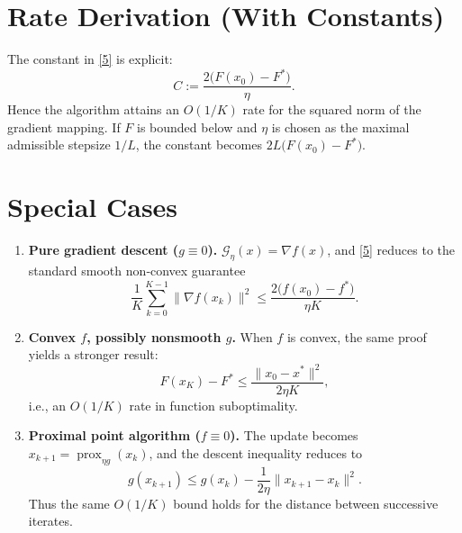 \documentclass{article}
\newcommand{\prox}{\operatorname{prox}}
\newcommand{\grad}{\nabla}
\begin{document}
\section*{Rate Derivation (With Constants)}
The constant in \eqref{5} is explicit:
\[
C:=\frac{2\big(F(x_{0})-F^{*}\big)}{\eta}.
\]
Hence the algorithm attains an $O(1/K)$ rate for the squared norm of the gradient mapping. If $F$ is bounded below and $\eta$ is chosen as the maximal admissible stepsize $1/L$, the constant becomes $2L\big(F(x_{0})-F^{*}\big)$.

\section*{Special Cases}
\begin{enumerate}
\item \textbf{Pure gradient descent ($g\equiv0$).}  
$\mathcal{G}_{\eta}(x)=\grad f(x)$, and \eqref{5} reduces to the standard smooth non‑convex guarantee
\[
\frac{1}{K}\sum_{k=0}^{K-1}\|\grad f(x_{k})\|^{2}\le\frac{2\big(f(x_{0})-f^{*}\big)}{\eta K}.
\]

\item \textbf{Convex $f$, possibly nonsmooth $g$.}  
When $f$ is convex, the same proof yields a stronger result:
\[
F(x_{K})-F^{*}\le\frac{\|x_{0}-x^{*}\|^{2}}{2\eta K},
\]
i.e., an $O(1/K)$ rate in function suboptimality.

\item \textbf{Proximal point algorithm ($f\equiv0$).}  
The update becomes $x_{k+1}= \prox_{\eta g}(x_{k})$, and the descent inequality reduces to
\[
g(x_{k+1})\le g(x_{k})-\frac{1}{2\eta}\|x_{k+1}-x_{k}\|^{2}.
\]
Thus the same $O(1/K)$ bound holds for the distance between successive iterates.
\end{enumerate}
\end{document}
